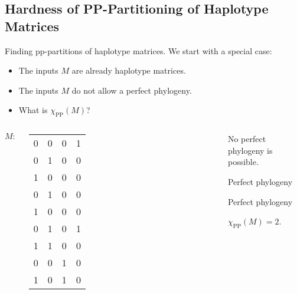 \documentclass{beamer}
\begin{document}
\subsection{Hardness of PP-Partitioning of Haplotype Matrices}

\begin{frame}{Finding pp-partitions of haplotype matrices.}
	We start with a special case:
	\begin{itemize}
		\item The inputs $M$ are \alert{already haplotype matrices}.
		\item The inputs $M$ \alert{do not allow a perfect phylogeny}.
		\item What is $\chi_{\operatorname{PP}}(M)$?
	\end{itemize}
	\begin{example}
		\begin{columns}
			$M\colon$
			\footnotesize
			\begin{tabular}{cccc}
				0 & 0 & 0 & 1 \\
				0 & 1 & 0 & 0 \\
				1 & 0 & 0 & 0 \\
				0 & 1 & 0 & 0 \\
				1 & 0 & 0 & 0 \\
				0 & 1 & 0 & 1 \\
				1 & 1 & 0 & 0 \\
				0 & 0 & 1 & 0 \\
				1 & 0 & 1 & 0
			\end{tabular}%
			{%
			}
			\begin{overprint}
				No perfect phylogeny is possible.

				\textcolor{blue!70!bg}{Perfect phylogeny}

				\textcolor{red!70!bg}{Perfect phylogeny}

				$\chi_{\operatorname{PP}}(M) = 2$.

			\end{overprint}
		\end{columns}
	\end{example}
\end{frame}
\end{document}
